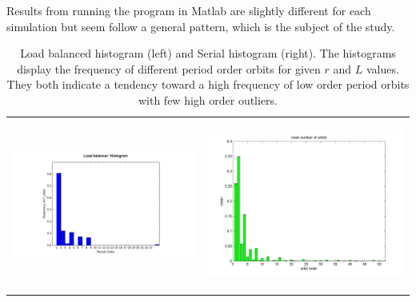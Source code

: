 \documentclass[12pt]{article}
\begin{document}
Results from running the program in  Matlab are slightly different for each simulation but seem follow a general pattern, which is the subject of the study. 
\begin {table}[H]
\begin{center}
\begin{tabular}{ p{8cm} p{8cm}}    
\begin{center}\includegraphics[scale=0.3]{hist}\end{center}&\begin{center} \includegraphics[scale=0.4]{serial_hist}\end{center}
\end{tabular}
\caption {Load balanced histogram (left) and Serial histogram
  (right). The histograms display the frequency of different period order orbits for given $r$ and $L$ values. They both indicate a tendency toward a high frequency of low order period orbits with few high order outliers.} \label{hist}
\end{center}
\end {table}
\end{document}
